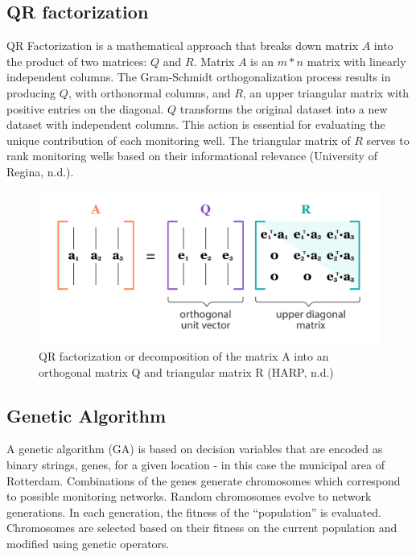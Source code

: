 \subsection{QR factorization}
QR Factorization is a mathematical approach that breaks down matrix \(A\) into the product of two matrices: \(Q\) and \(R\).  Matrix  \(A\) is an \(m*n\) matrix with linearly independent columns. The Gram-Schmidt orthogonalization process results in producing \(Q\), with orthonormal columns, and \(R\), an upper triangular matrix with positive entries on the diagonal. \(Q\) transforms the original dataset into a new dataset with independent columns. This action is essential for evaluating the unique contribution of each monitoring well. The triangular matrix of \(R\) serves to rank monitoring wells based on their informational relevance (University of Regina, n.d.).


\begin{figure}[htbp]
    \centering
    \includegraphics[width=0.5\linewidth]{appendix/qrfac.png}
    \caption{QR factorization or decomposition of the matrix A into an orthogonal matrix Q and triangular matrix R (HARP, n.d.)}
    \label{QR}
    
\end{figure}


\subsection{Genetic Algorithm}
A genetic algorithm (GA) is based on decision variables that are encoded as binary strings, genes, for a given location - in this case the municipal area of Rotterdam. Combinations of the genes generate chromosomes which correspond to possible monitoring networks. Random chromosomes evolve to network generations. In each generation, the fitness of the “population” is evaluated. Chromosomes are selected based on their fitness on the current population and modified using genetic operators. 

